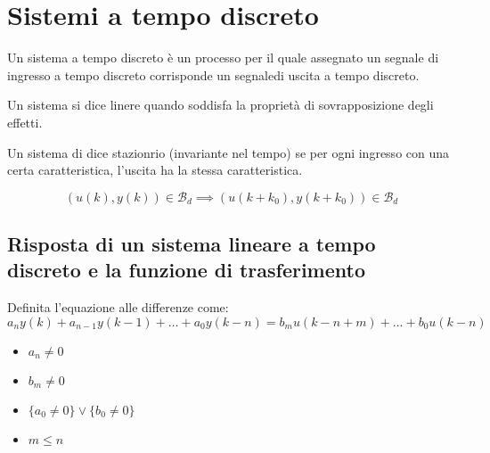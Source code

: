 \section{Sistemi a tempo discreto}

\begin{definition}
  Un sistema a tempo discreto è un processo per il quale assegnato un segnale
  di ingresso a tempo discreto corrisponde un segnaledi uscita a tempo discreto.
\end{definition}

\begin{definition}[Linearità]
  Un sistema si dice linere quando soddisfa la proprietà di sovrapposizione
  degli effetti.  
\end{definition}


\begin{definition}[Stazionarietà]
  Un sistema di dice stazionrio (invariante nel tempo) se per ogni ingresso
  con una certa caratteristica, l'uscita ha la stessa caratteristica.

  \begin{equation}
    (u(k), y(k)) \in \mathcal{B}_d \implies (u(k + k_0), y(k + k_0)) \in \mathcal{B}_d
  \end{equation}
\end{definition}


\subsection{Risposta di un sistema lineare a tempo discreto e la funzione di trasferimento}


Definita l'equazione alle differenze come:
\begin{equation}
  a_n y(k) + a_{n-1} y(k-1) + \dots + a_0 y(k-n) = b_m u(k - n + m)  + \dots + b_0 u(k-n)
\end{equation}

\begin{itemize}
  \item $a_n \neq 0$
  \item $b_m \neq 0$
  \item $\{ a_0 \neq 0 \} \vee \{ b_0 \neq 0\}$
  \item $m \leq n$
\end{itemize}
